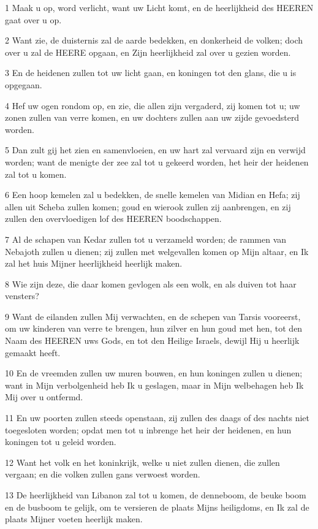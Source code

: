 \par 1 Maak u op, word verlicht, want uw Licht komt, en de heerlijkheid des HEEREN gaat over u op.
\par 2 Want zie, de duisternis zal de aarde bedekken, en donkerheid de volken; doch over u zal de HEERE opgaan, en Zijn heerlijkheid zal over u gezien worden.
\par 3 En de heidenen zullen tot uw licht gaan, en koningen tot den glans, die u is opgegaan.
\par 4 Hef uw ogen rondom op, en zie, die allen zijn vergaderd, zij komen tot u; uw zonen zullen van verre komen, en uw dochters zullen aan uw zijde gevoedsterd worden.
\par 5 Dan zult gij het zien en samenvloeien, en uw hart zal vervaard zijn en verwijd worden; want de menigte der zee zal tot u gekeerd worden, het heir der heidenen zal tot u komen.
\par 6 Een hoop kemelen zal u bedekken, de snelle kemelen van Midian en Hefa; zij allen uit Scheba zullen komen; goud en wierook zullen zij aanbrengen, en zij zullen den overvloedigen lof des HEEREN boodschappen.
\par 7 Al de schapen van Kedar zullen tot u verzameld worden; de rammen van Nebajoth zullen u dienen; zij zullen met welgevallen komen op Mijn altaar, en Ik zal het huis Mijner heerlijkheid heerlijk maken.
\par 8 Wie zijn deze, die daar komen gevlogen als een wolk, en als duiven tot haar vensters?
\par 9 Want de eilanden zullen Mij verwachten, en de schepen van Tarsis vooreerst, om uw kinderen van verre te brengen, hun zilver en hun goud met hen, tot den Naam des HEEREN uws Gods, en tot den Heilige Israels, dewijl Hij u heerlijk gemaakt heeft.
\par 10 En de vreemden zullen uw muren bouwen, en hun koningen zullen u dienen; want in Mijn verbolgenheid heb Ik u geslagen, maar in Mijn welbehagen heb Ik Mij over u ontfermd.
\par 11 En uw poorten zullen steeds openstaan, zij zullen des daags of des nachts niet toegesloten worden; opdat men tot u inbrenge het heir der heidenen, en hun koningen tot u geleid worden.
\par 12 Want het volk en het koninkrijk, welke u niet zullen dienen, die zullen vergaan; en die volken zullen gans verwoest worden.
\par 13 De heerlijkheid van Libanon zal tot u komen, de denneboom, de beuke boom en de busboom te gelijk, om te versieren de plaats Mijns heiligdoms, en Ik zal de plaats Mijner voeten heerlijk maken.
